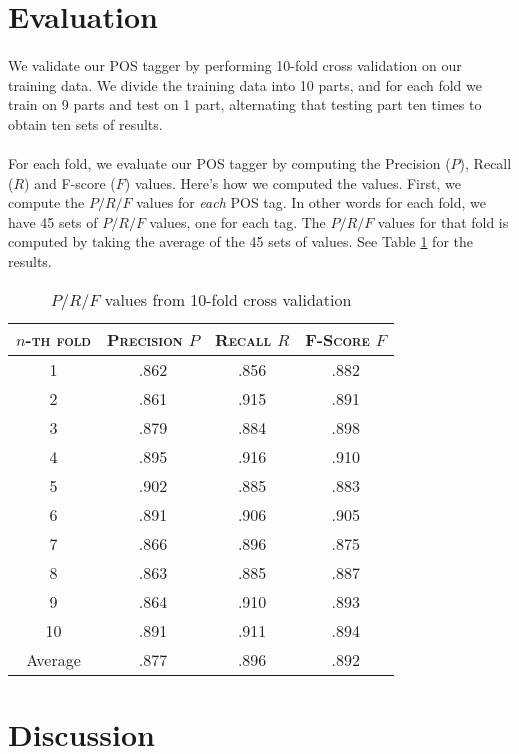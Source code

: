 \documentclass[12pt]{article}
\begin{document}
\section{Evaluation}
\paragraph{}
We validate our POS tagger by performing 10-fold cross validation on our training data. We divide the training data into 10 parts, and for each fold we train on 9 parts and test on 1 part, alternating that testing part ten times to obtain ten sets of results.

\paragraph{}
For each fold, we evaluate our POS tagger by computing the Precision ($P$), Recall ($R$) and F-score ($F$) values. Here's how we computed the values. First, we compute the $P/R/F$ values for \textit{each} POS tag. In other words for each fold, we have 45 sets of $P/R/F$ values, one for each tag. The $P/R/F$ values for that fold is computed by taking the average of the 45 sets of values. See Table \ref{tab:tenfold} for the results.

\begin{table}[h]
	\center
	\begin{tabular}{ c  c  c  c}
		\textsc{$n$-th fold} & \textsc{Precision $P$} & \textsc{Recall $R$} & \textsc{F-Score $F$} \\
		\hline
		1 & .862 & .856 & .882\\
		2 & .861 & .915 & .891\\
		3 & .879 & .884 & .898\\
		4 & .895 & .916 & .910\\
		5 & .902 & .885 & .883\\
		6 & .891 & .906 & .905\\
		7 & .866 & .896 & .875\\
		8 & .863 & .885 & .887\\
		9 & .864 & .910 & .893\\
		10 & .891 & .911 & .894\\
		Average & .877 & .896 & .892
	\end{tabular}
	\caption{$P/R/F$ values from 10-fold cross validation}
	\label{tab:tenfold}
\end{table}

\newpage
\section{Discussion}
\end{document}
